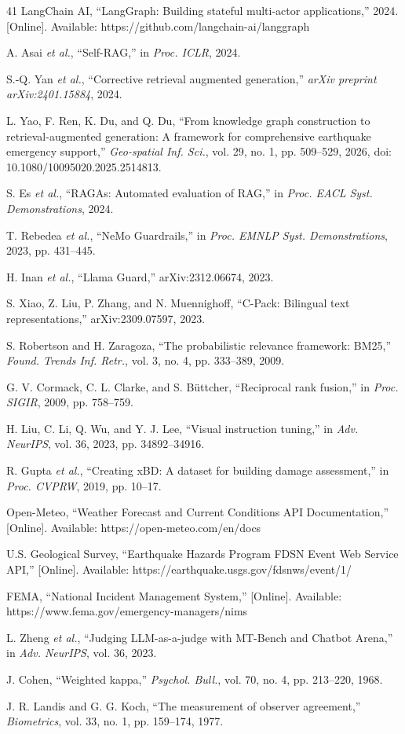 \documentclass[conference]{IEEEtran}
\begin{document}
\begin{thebibliography}{41}
 LangChain AI, ``LangGraph: Building stateful multi-actor applications,'' 2024. [Online]. Available: https://github.com/langchain-ai/langgraph

 A. Asai \textit{et al.}, ``Self-RAG,'' in \textit{Proc. ICLR}, 2024.

 S.-Q. Yan \textit{et al.}, ``Corrective retrieval augmented generation,'' \textit{arXiv preprint arXiv:2401.15884}, 2024.

 L. Yao, F. Ren, K. Du, and Q. Du, ``From knowledge graph construction to retrieval-augmented generation: A framework for comprehensive earthquake emergency support,'' \textit{Geo-spatial Inf. Sci.}, vol. 29, no. 1, pp. 509--529, 2026, doi: 10.1080/10095020.2025.2514813.

 S. Es \textit{et al.}, ``RAGAs: Automated evaluation of RAG,'' in \textit{Proc. EACL Syst. Demonstrations}, 2024.

 T. Rebedea \textit{et al.}, ``NeMo Guardrails,'' in \textit{Proc. EMNLP Syst. Demonstrations}, 2023, pp. 431--445.

 H. Inan \textit{et al.}, ``Llama Guard,'' arXiv:2312.06674, 2023.

 S. Xiao, Z. Liu, P. Zhang, and N. Muennighoff, ``C-Pack: Bilingual text representations,'' arXiv:2309.07597, 2023.

 S. Robertson and H. Zaragoza, ``The probabilistic relevance framework: BM25,'' \textit{Found. Trends Inf. Retr.}, vol. 3, no. 4, pp. 333--389, 2009.

 G. V. Cormack, C. L. Clarke, and S. B\"{u}ttcher, ``Reciprocal rank fusion,'' in \textit{Proc. SIGIR}, 2009, pp. 758--759.

 H. Liu, C. Li, Q. Wu, and Y. J. Lee, ``Visual instruction tuning,'' in \textit{Adv. NeurIPS}, vol. 36, 2023, pp. 34892--34916.

 R. Gupta \textit{et al.}, ``Creating xBD: A dataset for building damage assessment,'' in \textit{Proc. CVPRW}, 2019, pp. 10--17.

 Open-Meteo, ``Weather Forecast and Current Conditions API Documentation,'' [Online]. Available: https://open-meteo.com/en/docs

 U.S. Geological Survey, ``Earthquake Hazards Program FDSN Event Web Service API,'' [Online]. Available: https://earthquake.usgs.gov/fdsnws/event/1/

 FEMA, ``National Incident Management System,'' [Online]. Available: https://www.fema.gov/emergency-managers/nims

 L. Zheng \textit{et al.}, ``Judging LLM-as-a-judge with MT-Bench and Chatbot Arena,'' in \textit{Adv. NeurIPS}, vol. 36, 2023.

 J. Cohen, ``Weighted kappa,'' \textit{Psychol. Bull.}, vol. 70, no. 4, pp. 213--220, 1968.

 J. R. Landis and G. G. Koch, ``The measurement of observer agreement,'' \textit{Biometrics}, vol. 33, no. 1, pp. 159--174, 1977.
\end{thebibliography}
\end{document}
